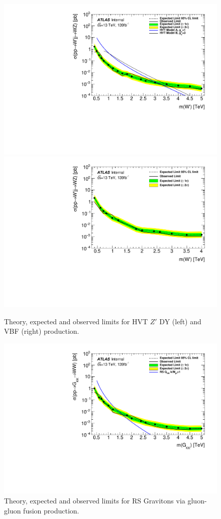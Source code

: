 \begin{figure}[h!]
  \centering
  \includegraphics[width=0.48\hsize]{figures/results/limits/limits_hvtwz.pdf}
  \includegraphics[width=0.48\hsize]{figures/results/limits/limits_hvtwzvbf.pdf}

 \caption{Theory, expected and observed limits for HVT $Z'$ DY (left) and VBF (right) production.}
  \label{fig:hvtwz_limit}
\end{figure} 
\FloatBarrier

\begin{figure}[h!]
  \centering
  \includegraphics[width=0.48\hsize]{figures/results/limits/limits_rsg.pdf}

 \caption{Theory, expected and observed limits for RS Gravitons via gluon-gluon fusion production.}
  \label{fig:rsg_limit}
\end{figure} 
\FloatBarrier

